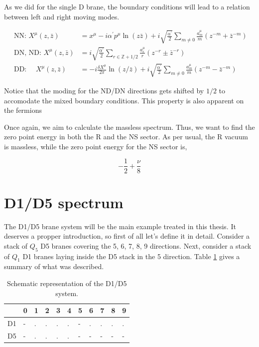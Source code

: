 As we did for the single D brane, the boundary conditions will lead to a relation between left and right moving modes. 

\begin{align}
    \text { NN: } X^\mu(z, \bar{z}) & =x^\mu-i \alpha^{\prime} p^\mu \ln (z \bar{z})+i \sqrt{\frac{\alpha^{\prime}}{2}} \sum_{m \neq 0} \frac{a_m^\mu}{m}\left(z^{-m}+\bar{z}^{-m}\right) \\
    \text { DN, ND: } X^\mu(z, \bar{z}) & =i \sqrt{\frac{\alpha^{\prime}}{2}} \sum_{r \in \mathbb{Z}+1 / 2} \frac{a_r^\mu}{r}\left(z^{-r} \pm \bar{z}^{-r}\right) \\
    \text { DD: } \quad X^\mu(z, \bar{z}) & =-i \frac{\delta X^\mu}{2 \pi} \ln (z / \bar{z})+i \sqrt{\frac{\alpha^{\prime}}{2}} \sum_{m \neq 0} \frac{a_m^\mu}{m}\left(z^{-m}-\bar{z}^{-m}\right)
\end{align}

Notice that the moding for the ND/DN directions gets shifted by $1/2$ to accomodate the mixed boundary conditions. This property is also apparent on the fermions 

Once again, we aim to calculate the massless spectrum. Thus, we want to find the zero point energy in both the R and the NS sector. As per usual, the R vacuum is massless, while the zero point energy for the NS sector is,

\begin{equation}
    \label{eq:zero-point-mixed}
    -\frac{1}{2} + \frac{\nu}{8}
\end{equation}

\section{D1/D5 spectrum}
\label{sec:D1D5_spectrum}

The D1/D5 brane system will be the main example treated in this thesis. It deserves a propper introduction, so first of all let's define it in detail. Consider a stack of $Q_5$ D5 branes covering the 5, 6, 7, 8, 9 directions. Next, consider a stack of $Q_1$ D1 branes laying inside the D5 stack in the 5 direction. Table \ref{table:D1/D5} gives a summary of what was described.

\begin{table}[h]
    \label{tab:3_d1d5_definition}
    \centering
    \begin{tabular}{|l|l|l|l|l|l|l|l|l|l|l|}
    \hline
       & 0 & 1 & 2 & 3 & 4 & 5 & 6 & 7 & 8 & 9 \\ \hline
    D1 & - & . & . & . & . & - & . & . & . & . \\ \hline
    D5 & - & . & . & . & . & - & - & - & - & - \\ \hline
\end{tabular}
\caption{Schematic representation of the D1/D5 system.}
\label{table:D1/D5}
\end{table}

